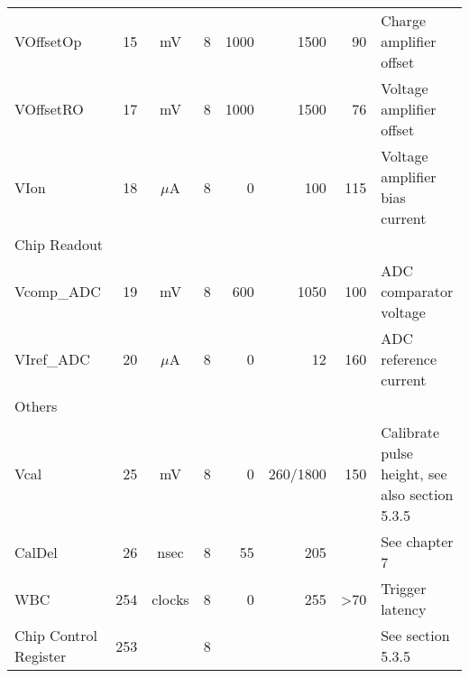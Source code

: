 \begin{table}[h]
\begin{center}
\begin{tabular}{lrccrrrl}
	VOffsetOp             & 15 &   mV        & 8 & 1000 & 1500 & 90 & Charge amplifier offset \\ 
	VOffsetRO             & 17 &   mV        & 8 & 1000 & 1500 & 76 & Voltage amplifier offset \\ 
	VIon                  & 18 & $\mu$A & 8 & 0 & 100 & 115 & Voltage amplifier bias current \\ 
	\multicolumn{ 8}{l}{Chip Readout} \\ 
	Vcomp\_ADC             & 19 & mV & 8 & 600 & 1050 & 100 & ADC comparator voltage \\ 
	VIref\_ADC            & 20 & $\mu$A & 8 & 0 & 12 & 160 & ADC reference current \\ 
	\multicolumn{ 8}{l}{Others} \\ 
	Vcal                  & 25 & mV & 8 & 0 & 260/1800 & 150 & Calibrate pulse height, see also section 5.3.5 \\ 
	CalDel                & 26 & nsec & 8 & 55 & 205 &  & See chapter 7 \\ 
	WBC                   & 254 & clocks    & 8 & 0 & 255 &                 >70 & Trigger latency \\ 
	Chip Control Register & 253 &  & 8 &  &  &  & See section 5.3.5 \\ 
	\bottomrule
	\end{tabular}
    \end{center}
\end{table}


